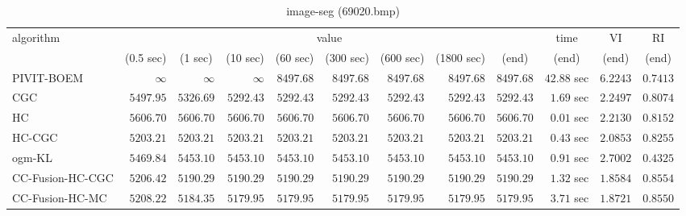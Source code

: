 \begin{table}[H]
\scriptsize
\centering
\caption{image-seg (69020.bmp)}
\label{tab:anytimetable-image-seg-69020.bmp}
\begin{tabular}{lrrrrrrrrrrr}
\toprule
           algorithm &                                   \multicolumn{8}{c}{value} & \multicolumn{1}{c}{time}    & \multicolumn{1}{c}{VI}  & \multicolumn{1}{c}{RI} \\  
\cmidrule(lr){2-9}\cmidrule(lr){10-10} \cmidrule(lr){11-11} \cmidrule(lr){12-12}   
                     & \multicolumn{1}{c}{(0.5 sec)} & \multicolumn{1}{c}{(1 sec)} & \multicolumn{1}{c}{(10 sec)} & \multicolumn{1}{c}{(60 sec)} & \multicolumn{1}{c}{(300 sec)} & \multicolumn{1}{c}{(600 sec)} & \multicolumn{1}{c}{(1800 sec)} & \multicolumn{1}{c}{(end)} & \multicolumn{1}{c}{(end)}    & \multicolumn{1}{c}{(end)}   & \multicolumn{1}{c}{(end)}  \\ \midrule 
          PIVIT-BOEM & $\infty$ & $\infty$ & $\infty$ & $      8497.68$ & $      8497.68$ & $      8497.68$ & $      8497.68$ & $      8497.68$ & $        42.88$ sec    & $       6.2243$  & $       0.7413$ \\ 
                 CGC & $      5497.95$ & $      5326.69$ & $      5292.43$ & $      5292.43$ & $      5292.43$ & $      5292.43$ & $      5292.43$ & $      5292.43$ & $         1.69$ sec    & $       2.2497$  & $       0.8074$ \\ 
                  HC & $      5606.70$ & $      5606.70$ & $      5606.70$ & $      5606.70$ & $      5606.70$ & $      5606.70$ & $      5606.70$ & $      5606.70$ & $         0.01$ sec    & $       2.2130$  & $       0.8152$ \\ 
              HC-CGC & $      5203.21$ & $      5203.21$ & $      5203.21$ & $      5203.21$ & $      5203.21$ & $      5203.21$ & $      5203.21$ & $      5203.21$ & $         0.43$ sec    & $       2.0853$  & $       0.8255$ \\ 
              ogm-KL & $      5469.84$ & $      5453.10$ & $      5453.10$ & $      5453.10$ & $      5453.10$ & $      5453.10$ & $      5453.10$ & $      5453.10$ & $         0.91$ sec    & $       2.7002$  & $       0.4325$ \\ 
    CC-Fusion-HC-CGC & $      5206.42$ & $      5190.29$ & $      5190.29$ & $      5190.29$ & $      5190.29$ & $      5190.29$ & $      5190.29$ & $      5190.29$ & $         1.32$ sec    & $       1.8584$  & $       0.8554$ \\ 
     CC-Fusion-HC-MC & $      5208.22$ & $      5184.35$ & $      5179.95$ & $      5179.95$ & $      5179.95$ & $      5179.95$ & $      5179.95$ & $      5179.95$ & $         3.71$ sec    & $       1.8721$  & $       0.8550$ \\ 

\end{tabular}
\end{table}
